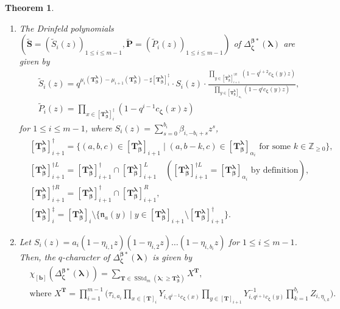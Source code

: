 \documentclass[12pt]{amsart}
\newtheorem{thm}{Theorem}[section]
\numberwithin{equation}{thm}
\newcommand\ZZ{\mathbb Z}
\newcommand\bP{\mathbf P}
\newcommand\bS{\mathbf S}
\newcommand\bT{\mathbf T}
\newcommand\bb{\mathbf b}
\newcommand\fn{\mathfrak n}
\renewcommand\a{\alpha}  %
\renewcommand\b{\beta}   %
\newcommand\D{\Delta}
\newcommand\Bb{\boldsymbol\beta}
\newcommand\Bz{\boldsymbol\zeta}
\newcommand\Bla{\boldsymbol\lambda}
\newcommand\wt{\widetilde}
\newcommand{\SStd}{\operatorname{SStd}}
\newcounter{ni}
\begin{document}
\begin{thm}
\begin{enumerate}
\item 
The Drinfeld polynomials $(\wt{\bS}=( \wt{S}_i(z))_{1 \leq i \leq m-1}, \wt{\bP} = (\wt{P}_i(z))_{1 \leq i \leq m-1})$ 
of $\D_{\Bz}^{\Bb*} (\Bla)$ are given by 
\begin{align*}
&\wt{S}_i(z) = q^{\mu_i (\bT_{\Bb}^{\Bla}) - \mu_{i+1} (\bT_{\Bb}^{\Bla}) - \sharp [\bT_{\Bb}^{\Bla}]_i^{\ddag}} 
	\cdot S_i(z) \cdot 
	\frac{ \prod_{y \in [\bT_{\Bb}^{\Bla}]_{i+1}^{\dag R}} (1 - q^{i+2} c_{\Bz}(y) z)}
		{\prod_{ y \in  [\bT_{\Bb}^{\Bla}]_{\a_i}} (1 - q^i c_{\Bz} (y) z)}, 
\\
& \wt{P}_i(z) = \prod_{x \in [\bT_{\Bb}^{\Bla}]_i^{\ddag}} (1 - q^{i-1} c_{\Bz} (x) z) 
\end{align*}
for $1 \leq i \leq m-1$, where $S_i(z) = \sum_{s=0}^{b_i} \b_{i, - b_i +s} z^s$, 
\begin{align*}
&[\bT_{\Bb}^{\Bla}]_{i+1}^\dag =\{ (a,b,c) \in [\bT_{\Bb}^{\Bla}]_{i+1} \mid (a,b-k,c) \in [\bT_{\Bb}^{\Bla}]_{\a_i} 
	\text{ for some } k \in \ZZ_{\geq 0} \}, 
\\
&[\bT_{\Bb}^{\Bla}]_{i+1}^{\dag L} = [\bT_{\Bb}^{\Bla}]_{i+1}^{\dag} \cap [\bT_{\Bb}^{\Bla}]_{i+1}^L 
\quad ([\bT_{\Bb}^{\Bla}]_{i+1}^{\dag L} = [\bT_{\Bb}^{\Bla}]_{\a_i} \text{ by definition}), 
\\
&
[\bT_{\Bb}^{\Bla}]_{i+1}^{\dag R} = [\bT_{\Bb}^{\Bla}]_{i+1}^{\dag} \cap [\bT_{\Bb}^{\Bla}]_{i+1}^R,  
\\
&[\bT_{\Bb}^{\Bla}]_i^{\ddag} 
= [\bT_{\Bb}^{\Bla}]_i \setminus \{ \fn_a (y) \mid y \in [\bT_{\Bb}^{\Bla}]_{i+1} \setminus [\bT_{\Bb}^{\Bla}]_{i+1}^{\dag}\}. 
\end{align*}  

\item 
Let $S_i(z) = a_i (1 - \eta_{i,1} z) (1 - \eta_{i,2} z) \dots (1 - \eta_{i, b_i} z)$ for $1 \leq i \leq m-1$. 
Then, the $q$-character of $\D_{\Bz}^{\Bb*} (\Bla)$ is given by 
\begin{align*}
&\chi_{[\bb]} (\D_{\Bz}^{\Bb *} (\Bla)) 
= \sum_{\bT \in \SStd_m(\Bla ; \geq \bT^{\Bla}_{\Bb}) }  X^{\bT}, 
\\
&\text{where } 
X^{\bT} = \prod_{i=1}^{m-1} \Big( \tau_{i, a_i} 
	\prod_{x \in [\bT]_i} Y_{i, q^{i-1} c_{\Bz}(x)} 
	\prod_{y \in [\bT]_{i+1}} Y_{i, q^{i+1} c_{\Bz} (y)}^{-1} 
	\prod_{k=1}^{b_i} Z_{i, \eta_{i,k}} \Big). 
\end{align*}
\end{enumerate}


\end{thm}
\end{document}
